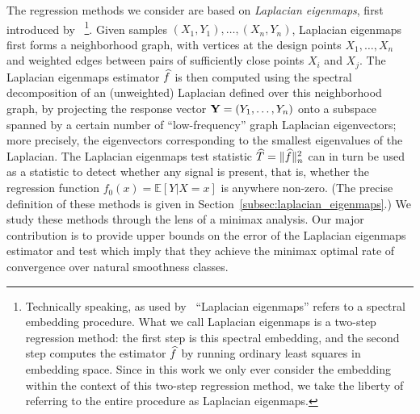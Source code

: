 The regression methods we consider are based on \emph{Laplacian eigenmaps}, first introduced by~\cite{belkin03a} \footnote{Technically speaking, as used by~\cite{belkin03a} ``Laplacian eigenmaps'' refers to a spectral embedding procedure. What we call Laplacian eigenmaps is a two-step regression method: the first step is this spectral embedding, and the second step computes the estimator $\widehat{f}$ by running ordinary least squares in embedding space.  Since in this work we only ever consider the embedding within the context of this two-step regression method, we take the liberty of referring to the entire procedure as Laplacian eigenmaps.}. Given samples $(X_1,Y_1),\ldots,(X_n,Y_n)$, Laplacian eigenmaps first forms a neighborhood graph, with vertices at the design points $X_1,\ldots,X_n$ and weighted edges between pairs of sufficiently close points $X_i$ and $X_j$. The Laplacian eigenmaps estimator $\widehat{f}$ is then computed using the spectral decomposition of an (unweighted) Laplacian defined over this neighborhood graph, by projecting the response vector ${\bf Y} = (Y_1,\ldots,Y_n)$ onto a subspace spanned by a certain number of ``low-frequency'' graph Laplacian eigenvectors; more precisely, the eigenvectors corresponding to the smallest eigenvalues of the Laplacian. The Laplacian eigenmaps test statistic $\widehat{T} = \|\widehat{f}\|_n^2$ can in turn be used as a statistic to detect whether any signal is present, that is, whether the regression function $f_0(x) = \mathbb{E}[Y|X = x]$ is anywhere non-zero. (The precise definition of these methods is given in Section~\ref{subsec:laplacian_eigenmaps}.) We study these methods through the lens of a minimax analysis. Our major contribution is to provide upper bounds on the error of the Laplacian eigenmaps estimator and test which imply that they achieve the minimax optimal rate of convergence over natural smoothness classes.

